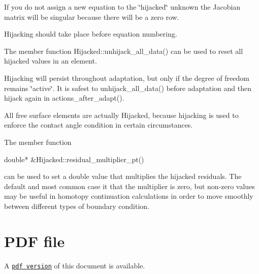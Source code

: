 \begin{DoxyItemize}
\item If you do not assign a new equation to the \char`\"{}hijacked\char`\"{} unknown the Jacobian matrix will be singular because there will be a zero row.
\item Hijacking should take place before equation numbering.
\item The member function {\ttfamily Hijacked\+::unhijack\+\_\+all\+\_\+data()} can be used to reset all hijacked values in an element.
\item Hijacking will persist throughout adaptation, but only if the degree of freedom remains \char`\"{}active\char`\"{}. It is safest to {\ttfamily unhijack\+\_\+all\+\_\+data()} before adaptation and then hijack again in {\ttfamily actions\+\_\+after\+\_\+adapt()}.
\item All free surface elements are actually {\ttfamily Hijacked}, because hijacking is used to enforce the contact angle condition in certain circumstances.
\item The member function 
\begin{DoxyCode}
\textcolor{keywordtype}{double}* &Hijacked::residual\_multiplier\_pt() 
\end{DoxyCode}
 can be used to set a double value that multiplies the hijacked residuals. The default and most common case it that the multiplier is zero, but non-\/zero values may be useful in homotopy continuation calculations in order to move smoothly between different types of boundary condition.
\end{DoxyItemize}





 

 \hypertarget{index_pdf}{}\section{P\+D\+F file}\label{index_pdf}
A \href{../latex/refman.pdf}{\tt pdf version} of this document is available. 
